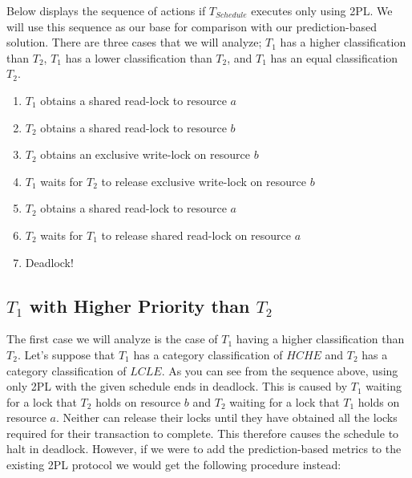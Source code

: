 \documentclass[conference]{IEEEtran}
\begin{document}
Below displays the sequence of actions if $T_{Schedule}$ executes only using 2PL. We will use this sequence as our base for comparison with our prediction-based solution. There are three cases that we will analyze; $T_{1}$ has a higher classification than $T_{2}$, $T_{1}$ has a lower classification than $T_{2}$, and $T_{1}$ has an equal classification $T_{2}$.

\begin{enumerate}
  \item $T_{1}$ obtains a shared read-lock to resource $a$
  \item $T_{2}$ obtains a shared read-lock to resource $b$
  \item $T_{2}$ obtains an exclusive write-lock on resource $b$
  \item $T_{1}$ waits for $T_{2}$ to release exclusive write-lock on resource $b$
  \item $T_{2}$ obtains a shared read-lock to resource $a$
  \item $T_{2}$ waits for $T_{1}$ to release shared read-lock on resource $a$
  \item Deadlock!
\end{enumerate}

\subsection{$T_{1}$ with Higher Priority than $T_{2}$}
\label{sec:t1_higher_than_t2}
The first case we will analyze is the case of $T_{1}$ having a higher classification than $T_{2}$. Let's suppose that $T_{1}$ has a category classification of $HCHE$ and $T_{2}$ has a category classification of $LCLE$. As you can see from the sequence above, using only 2PL with the given schedule ends in deadlock. This is caused by $T_{1}$ waiting for a lock that $T_{2}$ holds on resource $b$ and $T_{2}$ waiting for a lock that $T_{1}$ holds on resource $a$. Neither can release their locks until they have obtained all the locks required for their transaction to complete. This therefore causes the schedule to halt in deadlock. However, if we were to add the prediction-based metrics to the existing 2PL protocol we would get the following procedure instead:
\end{document}
